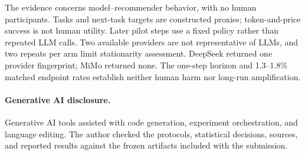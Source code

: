 \documentclass[sigconf]{acmart}
\begin{document}
The evidence concerns model--recommender behavior, with no human participants.
Tasks and next-task targets are constructed proxies; token-and-price success
is not human utility. Later pilot steps use a fixed policy rather than repeated
LLM calls. Two available providers are not representative of LLMs, and two
repeats per arm limit stationarity assessment. DeepSeek returned one provider
fingerprint; MiMo returned none. The one-step horizon and 1.3--1.8\% matched
endpoint rates establish neither human harm nor long-run amplification.

\paragraph{Generative AI disclosure.} Generative AI tools assisted with code
generation, experiment orchestration, and language editing. The author checked
the protocols, statistical decisions, sources, and reported results against the
frozen artifacts included with the submission.

\balance


\end{document}
